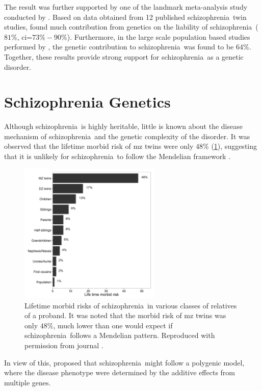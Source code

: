 \documentclass[12pt]{scrbook}
\newcommand*{\scz}{schizophrenia}
\begin{document}
The result was further supported by one of the landmark meta-analysis study conducted by \citet{sullivan2003schizophrenia}.
Based on data obtained from 12 published \scz\ twin studies, \citet{sullivan2003schizophrenia} found much contribution from genetics on the liability of \scz\ ($81\%$, \gls{ci}=$73\%-90\%$).
Furthermore, in the large scale population based studies performed by \citet{Lichtenstein2009}, the genetic contribution to \scz\ was found to be $64\%$.
Together, these results provide strong support for \scz\ as a genetic disorder. 

\section{Schizophrenia Genetics}
Although \scz\ is highly heritable, little is known about the disease mechanism of \scz\ and the genetic complexity of the disorder. 
It was observed that the lifetime morbid risk of \gls{mz} twins were only $48\%$ (\cref{fig:lifeMRscz}), suggesting that it is unlikely for \scz\ to follow the Mendelian framework \citep{Gottesman1967,Gottesman1982,gottesman1991schizophrenia}.	
\begin{figure}[t]
	\centering
	\includegraphics[width=0.6\textwidth]{figure/lifeTimeMorbidRisk.png}
	\caption[Lifetime morbid risks of \scz\ in various classes of relatives of a proband]{Lifetime morbid risks of \scz\ in various classes of relatives of a proband.
It was noted that the morbid risk of \gls{mz} twins was only $48\%$, much lower than one would expect if \scz\ follows a Mendelian pattern.
	Reproduced with permission from journal \citep{Riley2006}. \label{fig:lifeMRscz}}
\end{figure}
	
In view of this, \citet{Gottesman1967} proposed that \scz\ might follow a polygenic model, where the disease phenotype were determined by the additive effects from multiple genes.
	
\end{document}
